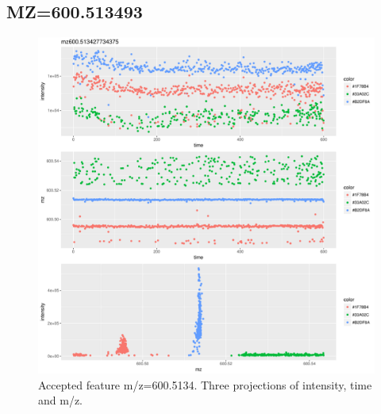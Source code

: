 \documentclass[]{article}
\begin{document}
\subsection{MZ=600.513493}\label{mz600.513493}

\begin{figure}[H]
\begin{center}
\includegraphics{Supplementary_document_files/figure-latex/cluster.mz.600-1.pdf}
\caption{Accepted feature m/z=600.5134. Three projections of intensity, time and m/z.}
\label{fig:d3.mz.600.5134}
\end{center}
\end{figure}
\end{document}
